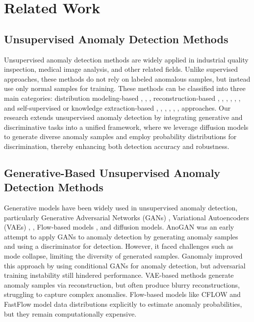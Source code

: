 \section{Related Work}
\subsection{Unsupervised Anomaly Detection Methods}

Unsupervised anomaly detection methods are widely applied in industrial quality inspection, medical image analysis, and other related fields. Unlike supervised approaches, these methods do not rely on labeled anomalous samples, but instead use only normal samples for training. These methods can be classified into three main categories: distribution modeling-based \cite{salehi2021multiresolution}, \cite{bergmann2020uninformed}, \cite{cao2022informative}, reconstruction-based \cite{gong2019memorizing}, \cite{zavrtanik2021reconstruction}, \cite{yang2020dfr}, \cite{zavrtanik2021draem}, \cite{tao2022unsupervised}, \cite{bergmann2018improving}, and self-supervised or knowledge extraction-based \cite{he2020momentum}, \cite{zhang2024realnet}, \cite{li2021cutpaste}, \cite{schluter2022natural}, \cite{zhang2023prototypical}, \cite{zhang2023destseg}, \cite{yuan2023causality} approaches. Our research extends unsupervised anomaly detection by integrating generative and discriminative tasks into a unified framework, where we leverage diffusion models to generate diverse anomaly samples and employ probability distributions for discrimination, thereby enhancing both detection accuracy and robustness.

\subsection{Generative-Based Unsupervised Anomaly Detection Methods}

Generative models have been widely used in unsupervised anomaly detection, particularly Generative Adversarial Networks (GANs) \cite{goodfellow2014generative}, Variational Autoencoders (VAEs) \cite{kingma2013auto}, \cite{vincent2008extracting}, Flow-based models \cite{dinh2016density}, and diffusion models. AnoGAN \cite{schlegl2017unsupervised} was an early attempt to apply GANs to anomaly detection by generating anomaly samples and using a discriminator for detection. However, it faced challenges such as mode collapse, limiting the diversity of generated samples. Ganomaly \cite{akcay2019ganomaly} improved this approach by using conditional GANs for anomaly detection, but adversarial training instability still hindered performance. VAE-based methods \cite{kingma2013auto} generate anomaly samples via reconstruction, but often produce blurry reconstructions, struggling to capture complex anomalies. Flow-based models like CFLOW \cite{gudovskiy2022cflow} and FastFlow \cite{yu2021fastflow} model data distributions explicitly to estimate anomaly probabilities, but they remain computationally expensive.

